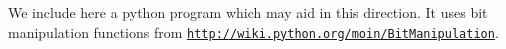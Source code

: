 \documentclass[%
oneside,                 %
final,                   %
10pt]{article}
\begin{document}
We include here a python program which may aid in this direction. It uses bit manipulation functions from \href{{http://wiki.python.org/moin/BitManipulation}}{\nolinkurl{http://wiki.python.org/moin/BitManipulation}}.
\end{document}
